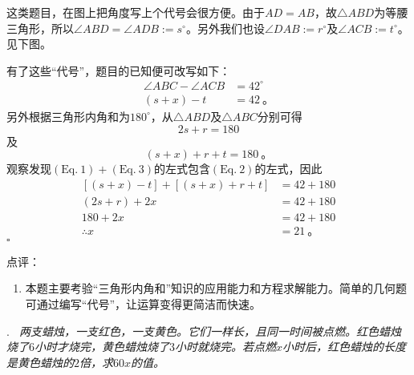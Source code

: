 \documentclass[a4,12pt]{article}
\newcounter{Problem}
\newcommand{\Problem}[2]{
		\vspace*{10pt}
		\label{Problem #1}
		\noindent#1.\emph{~#2}
	}
\newcommand{\Qed}{\hfill\ensuremath{\square}}
\begin{document}
	这类题目，在图上把角度写上个代号会很方便。由于$AD=AB$，故$\triangle{ABD}$为等腰三角形，所以$\angle ABD = \angle ADB := s^\circ$。另外我们也设$\angle DAB := r^\circ$及$\angle ACB := t^\circ$。见下图。
	\begin{center}
	\end{center}

	有了这些“代号”，题目的已知便可改写如下：
	\[ \begin{aligned}
			\angle ABC - \angle ACB &= 42^\circ \\
			(s+x) - t &= 42 \ \mbox{。}
		\end{aligned}
		\tag{Eq. 1}
	\]
	另外根据三角形内角和为$180^\circ$，从$\triangle{ABD}$及$\triangle{ABC}$分别可得
	\[ 2s + r = 180 \tag{Eq. 2} \]
	及
	\[ (s+x) + r + t = 180 \ \mbox{。} \tag{Eq. 3} \]
	观察发现$\mathrm{(Eq.~1)}+\mathrm{(Eq.~3)}$的左式包含$\mathrm{(Eq.~2)}$的左式，因此
	\[ \begin{aligned}
			[(s+x)-t] + [(s+x)+r+t] &= 42 + 180 \\
			(2s + r) + 2x &= 42 + 180 \\
			180 + 2x &= 42 + 180 \\
			\therefore x &= 21 \ \mbox{。}
		\end{aligned}
	\]
	\Qed
	\vspace*{30pt}

	\noindent 点评：
	\begin{enumerate}[label=(\alph*)]
		\item 本题主要考验“三角形内角和”知识的应用能力和方程求解能力。简单的几何题可通过编写“代号”，让运算变得更简洁而快速。
	\end{enumerate}

\pagebreak
\Problem{12}{
	两支蜡烛，一支红色，一支黄色。它们一样长，且同一时间被点燃。红色蜡烛烧了$6$小时才烧完，黄色蜡烛烧了$3$小时就烧完。若点燃$x$小时后，红色蜡烛的长度是黄色蜡烛的$2$倍，求$60x$的值。
	}
\end{document}
